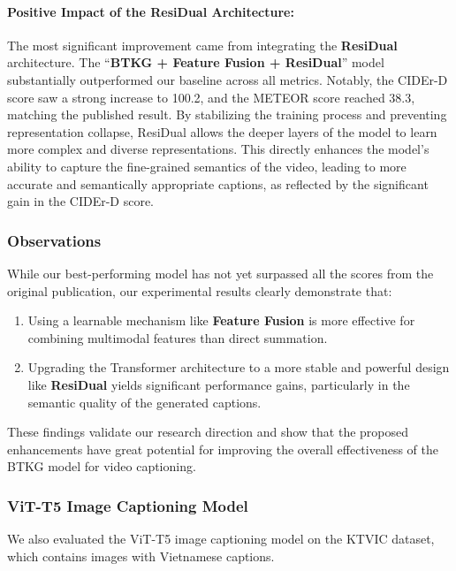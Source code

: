 \paragraph{Positive Impact of the ResiDual Architecture:} The most significant improvement came from integrating the \textbf{ResiDual} architecture. The ``\textbf{BTKG + Feature Fusion + ResiDual}'' model substantially outperformed our baseline across all metrics. Notably, the CIDEr-D score saw a strong increase to 100.2, and the METEOR score reached 38.3, matching the published result. By stabilizing the training process and preventing representation collapse, ResiDual allows the deeper layers of the model to learn more complex and diverse representations. This directly enhances the model's ability to capture the fine-grained semantics of the video, leading to more accurate and semantically appropriate captions, as reflected by the significant gain in the CIDEr-D score.

\subsubsection*{Observations}

While our best-performing model has not yet surpassed all the scores from the original publication, our experimental results clearly demonstrate that:

\begin{enumerate}[nosep]
    \item Using a learnable mechanism like \textbf{Feature Fusion} is more effective for combining multimodal features than direct summation.
    
    \item Upgrading the Transformer architecture to a more stable and powerful design like \textbf{ResiDual} yields significant performance gains, particularly in the semantic quality of the generated captions.
\end{enumerate}

These findings validate our research direction and show that the proposed enhancements have great potential for improving the overall effectiveness of the BTKG model for video captioning.


\subsubsection{ViT-T5 Image Captioning Model}

We also evaluated the ViT-T5 image captioning model on the KTVIC dataset, which contains images with Vietnamese captions.

